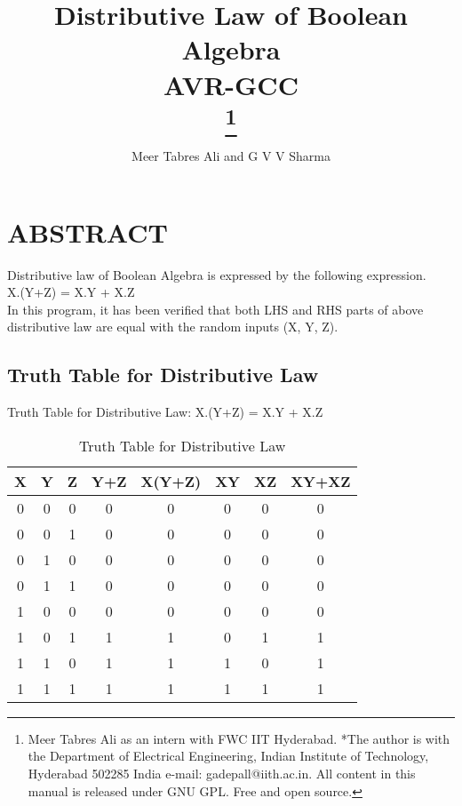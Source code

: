 \documentclass[conference]{IEEEtran}
\begin{document}
\title{
{Distributive Law of Boolean Algebra\\
AVR-GCC}\\

\thanks{Meer Tabres Ali as an intern with FWC IIT Hyderabad. *The author is with the Department of Electrical Engineering, Indian Institute of Technology, Hyderabad 502285 India e-mail: gadepall@iith.ac.in. All content in this manual is released under GNU GPL. Free and open source.}
}
\author{Meer Tabres Ali and G V V Sharma}
\maketitle

\section{ABSTRACT}
\begin{flushleft}
Distributive law of Boolean Algebra is expressed by the following expression.\\
X.(Y+Z) = X.Y + X.Z \\
In this program, it has been verified that both LHS and RHS parts of above distributive law are equal with the random inputs (X, Y, Z).\\
\end{flushleft}

\subsection{Truth Table for Distributive Law}
Truth Table for Distributive Law: X.(Y+Z) = X.Y + X.Z 

\begin{table}[htbp]
    \centering
\begin{tabular}{ | c | c | c | c | c | c | c | c | } \hline
\textbf{X} & \textbf{Y} & \textbf{Z} & \textbf{Y+Z} & \textbf{X(Y+Z)} & \textbf{XY} & \textbf{XZ} & \textbf{XY+XZ} \\\hline
0 & 0 & 0 & 0 & 0 & 0 & 0 & 0 \\
0 & 0 & 1 & 0 & 0 & 0 & 0 & 0 \\
0 & 1 & 0 & 0 & 0 & 0 & 0 & 0 \\
0 & 1 & 1 & 0 & 0 & 0 & 0 & 0 \\
1 & 0 & 0 & 0 & 0 & 0 & 0 & 0 \\
1 & 0 & 1 & 1 & 1 & 0 & 1 & 1 \\
1 & 1 & 0 & 1 & 1 & 1 & 0 & 1 \\
1 & 1 & 1 & 1 & 1 & 1 & 1 & 1 \\ \hline
\end{tabular}
\vspace{0.4cm}
\caption{\label{tab:widgets}Truth Table for Distributive Law}
\end{table}
\end{document}
